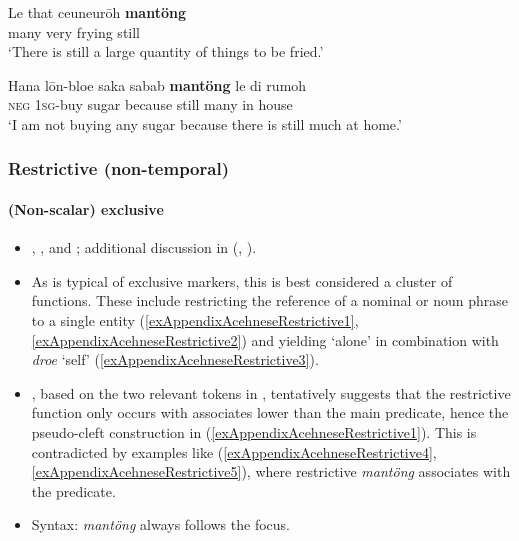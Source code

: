 \begin{exe}
	\ex\label{exAppendixAcehneseDecrement1}
	 \gll Le that ceuneurōh \textbf{mantöng}\\
	many very frying still\\
	\glt \lq There is still a large quantity of things to be fried.'
	\parencite[57]{Asyik1987}

	\ex \label{exAppendixAcehneseDecrement2}
	\gll Hana lōn-bloe saka sabab \textbf{mantöng} le di rumoh\\
	\textsc{neg} 1\textsc{sg}-buy sugar because still many in house\\
	\glt \lq I am not buying any sugar because there is still much at home.\rq{ }\parencite[175]{Asyik1987}
\end{exe}

\subsubsection{Restrictive (non-temporal)}
\paragraph{(Non-scalar) exclusive}\label{appendixAcehneseRestrictive}
\begin{itemize}
	\sloppy
	\item \textcite[223–225]{Durie1985}, \textcite[30]{DjajadiningratVol2}, \textcite[175]{Kreemer1931} and \textcite[32, 63]{Hurgronje1900}; additional discussion in \citeauthor{vanBaar1991} (\citeyear{vanBaar1991}, \citeyear[110–111]{vanBaar1997}).
	\item As is typical of exclusive markers, this is best considered a cluster of functions. These include restricting the reference of a nominal or noun phrase to a single entity (\ref{exAppendixAcehneseRestrictive1}, \ref{exAppendixAcehneseRestrictive2}) and yielding \lq alone' in combination with \textit{droe} \lq self' (\ref{exAppendixAcehneseRestrictive3}). 
	\item \Textcite{vanBaar1991}, based on the two relevant tokens in \textcite{Durie1985}, tentatively suggests that the restrictive function only occurs with associates lower than the main predicate, hence the pseudo-cleft construction in (\ref{exAppendixAcehneseRestrictive1}). This is contradicted by examples like (\ref{exAppendixAcehneseRestrictive4}, \ref{exAppendixAcehneseRestrictive5}), where restrictive \textit{mantöng} associates with the predicate.
	\item Syntax: \textit{mantöng} always follows the focus.
\end{itemize}

